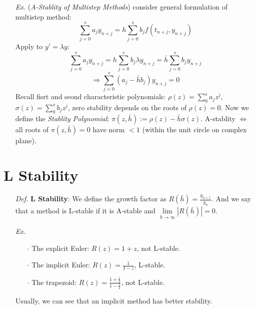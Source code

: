 \documentclass[a4paper, 11pt]{article}
\begin{document}
\begin{itemize}
	\item[\textit{Ex.}] (\emph{A-Stablity of Multistep Methods}) consider general formulation of multistep method:
	\begin{equation}
		\sum_{j=0}^s a_j y_{n+j} = h\sum_{j=0}^s b_j f(t_{n+j}, y_{n+j})
	\end{equation}
	Apply to $y'=\lambda y$: 
	\begin{equation}
		\sum_{j=0}^s a_j y_{n+j} = h \sum_{j=0}^s b_j \lambda y_{n+j} = \bar{h} \sum_{j=0}^s b_j y_{n+j}
	\end{equation}
	$$
	\Rightarrow \sum_{j=0}^s (a_j - \bar{h}b_j) y_{n+j} = 0
	$$
	Recall fisrt and seond characteristic polynomials: $\rho(z)=\sum_0^s a_j z^j$, $\sigma(z)=\sum_0^s b_j z^j$, zero stability depends on the roots of $\rho(z)=0$. Now we define the \emph{Stablity Polynomial}: $\pi(z, \bar{h}):=\rho(z) - \bar{h}\sigma(z)$. A-stablity $\iff$ all roots of $\pi(z, \bar{h})=0$ have norm $<1$ (within the unit circle on complex plane).
\end{itemize}


\section{L Stability}
\begin{itemize}
	\item[\textit{Def.}] \textbf{L Stability}: We define the growth factor as $R(\bar{h})=\frac{y_{n+1}}{y_n}$. And we say that a method is L-stable if it is A-stable and $\lim\limits_{\bar{h}\rightarrow\infty}|R(\bar{h})| =0$.

	\item[\textit{Ex.}] 
	\begin{itemize}
		\item[$\cdot$] The explicit Euler: $R(z)=1+z$, not L-stable.
		\item[$\cdot$] The implicit Euler: $R(z)=\frac{1}{1-z}$, L-stable.
		\item[$\cdot$] The trapezoid: $R(z)=\frac{1+\frac{z}{2}}{1-\frac{z}{2}}$, not L-stable. 
	\end{itemize}
	Usually, we can see that an implicit method has better stability.
\end{itemize}
\end{document}
